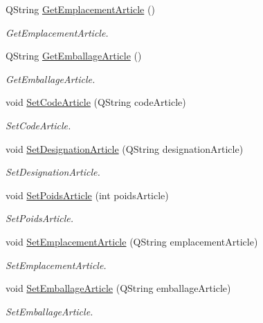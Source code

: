 \begin{DoxyCompactItemize}
Q\+String \mbox{\hyperlink{class_article_aca48728ecc7862026b40b18db12591fa}{Get\+Emplacement\+Article}} ()
\begin{DoxyCompactList}\small\item\em Get\+Emplacement\+Article. \end{DoxyCompactList}\item 
Q\+String \mbox{\hyperlink{class_article_aa086c1a1aa8af81fb34c9a20b05d0155}{Get\+Emballage\+Article}} ()
\begin{DoxyCompactList}\small\item\em Get\+Emballage\+Article. \end{DoxyCompactList}\item 
void \mbox{\hyperlink{class_article_a5300f5a6247dd931cb411d7ff1721d7f}{Set\+Code\+Article}} (Q\+String code\+Article)
\begin{DoxyCompactList}\small\item\em Set\+Code\+Article. \end{DoxyCompactList}\item 
void \mbox{\hyperlink{class_article_a6ee68c7584a20323039ab5065c34eb81}{Set\+Designation\+Article}} (Q\+String designation\+Article)
\begin{DoxyCompactList}\small\item\em Set\+Designation\+Article. \end{DoxyCompactList}\item 
void \mbox{\hyperlink{class_article_af2412d92eb7d53ca7566755a900653c0}{Set\+Poids\+Article}} (int poids\+Article)
\begin{DoxyCompactList}\small\item\em Set\+Poids\+Article. \end{DoxyCompactList}\item 
void \mbox{\hyperlink{class_article_ae543837747d1022bd91afb5ca7e7cc32}{Set\+Emplacement\+Article}} (Q\+String emplacement\+Article)
\begin{DoxyCompactList}\small\item\em Set\+Emplacement\+Article. \end{DoxyCompactList}\item 
void \mbox{\hyperlink{class_article_abfde880e0537319807827026d0d7897f}{Set\+Emballage\+Article}} (Q\+String emballage\+Article)
\begin{DoxyCompactList}\small\item\em Set\+Emballage\+Article. \end{DoxyCompactList}\end{DoxyCompactItemize}


